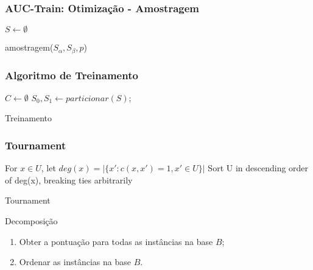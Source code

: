 \begin{frame}
    \frametitle{AUC-Train: Otimização - Amostragem}

    \begin{function}[H]
        $S \gets \emptyset$\;



        \caption{amostragem($S_{\alpha}, S_{\beta}, p$)}
    \end{function}
\end{frame}

\begin{frame}
    \frametitle{Algoritmo de Treinamento}

    \begin{algorithm}[H]
        $C \gets \emptyset$\;
        $S_0, S_1 \gets particionar(S)$;



        \caption{Treinamento}
    \end{algorithm}
\end{frame}

\begin{frame}
    \frametitle{Tournament}

    \begin{algorithm}[H]
        For $x \in U$, let $deg(x) = |\{x':c(x, x') = 1, x' \in U\}|$\;
        Sort U in descending order of deg(x), breaking ties arbitrarily

        \caption{Tournament}
    \end{algorithm}

    \begin{block}{Decomposição}
        \begin{enumerate}
            \item Obter a pontuação para todas as instâncias na base $B$;
            \item Ordenar as instâncias na base $B$.
        \end{enumerate}
    \end{block}
\end{frame}

